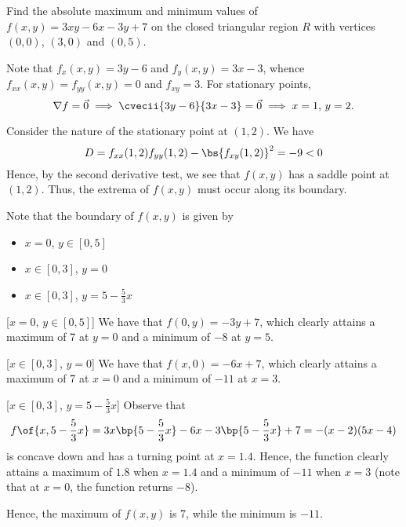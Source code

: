 \begin{problem}
    Find the absolute maximum and minimum values of $f(x, y) = 3xy - 6x - 3y + 7$ on the closed triangular region $R$ with vertices $(0, 0)$, $(3, 0)$ and $(0, 5)$.
\end{problem}
\begin{solution}
    Note that $f_x(x, y) = 3y - 6$ and $f_y(x, y) = 3x - 3$, whence $f_{xx}(x, y) = f_{yy}(x, y) = 0$ and $f_{xy} = 3$. For stationary points, \[\nabla f = \vec 0 \implies \cvecii{3y-6}{3x-3} = \vec 0 \implies x = 1, \, y = 2.\]

    Consider the nature of the stationary point at $(1, 2)$. We have \[D = f_{xx}(1, 2)f_{yy}(1, 2) - \bs{f_{xy}(1, 2)}^2 = -9 < 0\] Hence, by the second derivative test, we see that $f(x, y)$ has a saddle point at $(1, 2)$. Thus, the extrema of $f(x, y)$ must occur along its boundary.

    Note that the boundary of $f(x, y)$ is given by
    \begin{itemize}
        \item $x = 0$, $y \in [0, 5]$
        \item $x \in [0, 3]$, $y = 0$
        \item $x \in [0, 3]$, $y = 5 - \frac53 x$
    \end{itemize}

    [$x = 0$, $y \in [0,5]$] We have that $f(0, y) = -3y + 7$, which clearly attains a maximum of 7 at $y = 0$ and a minimum of $-8$ at $y = 5$.

    [$x \in [0, 3]$, $y = 0$] We have that $f(x, 0) = -6x + 7$, which clearly attains a maximum of 7 at $x = 0$ and a minimum of $-11$ at $x = 3$.

    [$x \in [0, 3]$, $y = 5 - \frac53 x$] Observe that \[f\of{x, 5 - \frac53 x} = 3x\bp{5 - \frac53 x} - 6x - 3\bp{5 - \frac53 x} + 7 = -(x-2)(5x-4)\] is concave down and has a turning point at $x = 1.4$. Hence, the function clearly attains a maximum of $1.8$ when $x = 1.4$ and a minimum of $-11$ when $x = 3$ (note that at $x = 0$, the function returns $-8$). 

    Hence, the maximum of $f(x, y)$ is 7, while the minimum is $-11$.
\end{solution}

